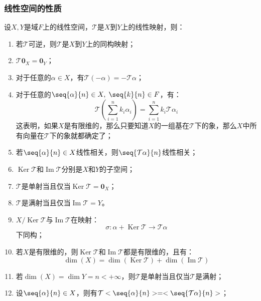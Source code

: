 \subsubsection{线性空间的性质}
\begin{property}\label{prop:LinearMapping}
	设$X,Y$是域$F$上的线性空间，$\mathcal{T}$是$X$到$Y$上的线性映射，则：
	\begin{enumerate}
		\item 若$\mathcal{T}$可逆，则$\mathcal{T}$是$X$到$Y$上的同构映射；
		\item $\mathcal{T}\mathbf{0}_X=\mathbf{0}_Y$；
		\item 对于任意的$\alpha\in X$，有$\mathcal{T}(-\alpha)=-\mathcal{T}\alpha$；
		\item 对于任意的$\seq{\alpha}{n}\in X,\;\seq{k}{n}\in F$，有：
		\begin{equation*}
			\mathcal{T}\left(\sum_{i=1}^{n}k_i\alpha_i\right)=\sum_{i=1}^{n}k_i\mathcal{T}\alpha_i
		\end{equation*}
		这表明，如果$X$是有限维的，那么只要知道$X$的一组基在$\mathcal{T}$下的象，那么$X$中所有向量在$\mathcal{T}$下的象就都确定了；
		\item 若$\seq{\alpha}{n}\in X$线性相关，则$\seq{\mathcal{T}\alpha}{n}$线性相关；
		\item $\operatorname{Ker}\mathcal{T}$和$\operatorname{Im}\mathcal{T}$分别是$X$和$Y$的子空间；
		\item $\mathcal{T}$是单射当且仅当$\operatorname{Ker}\mathcal{T}=\mathbf{0}_X$；
		\item $\mathcal{T}$是满射当且仅当$\operatorname{Im}\mathcal{T}=Y$。
		\item $X/\operatorname{Ker}\mathcal{T}$与$\operatorname{Im}\mathcal{T}$在映射：
		\begin{equation*}
			\sigma:\alpha+\operatorname{Ker}\mathcal{T}\longrightarrow\mathcal{T}\alpha
		\end{equation*}
		下同构；
		\item 若$X$是有限维的，则$\operatorname{Ker}\mathcal{T}$和$\operatorname{Im}\mathcal{T}$都是有限维的，且有：
		\begin{equation*}
			\dim(X)=\dim(\operatorname{Ker}\mathcal{T})+\dim(\operatorname{Im}\mathcal{T})
		\end{equation*}
		\item 若$\dim(X)=\dim Y=n<+\infty$，则$\mathcal{T}$是单射当且仅当$\mathcal{T}$是满射；
		\item 设$\seq{\alpha}{n}\in X$，则有$\mathcal{T}<\seq{\alpha}{n}>=<\seq{\mathcal{T}\alpha}{n}>$；
	\end{enumerate}
\end{property}
